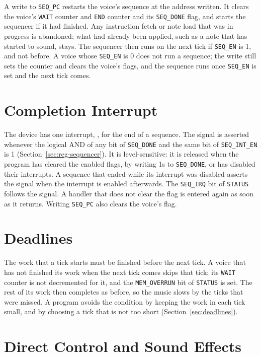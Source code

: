 A write to \texttt{SEQ\_PC} restarts the voice's sequence at the address written. It clears the voice's \texttt{WAIT}
counter and \texttt{END} counter and its \texttt{SEQ\_DONE} flag, and starts the sequencer if it had finished. Any
instruction fetch or note load that was in progress is abandoned; what had already been applied, such as a note that
has started to sound, stays. The sequencer then runs on the next tick if \texttt{SEQ\_EN} is 1, and not before. A voice
whose \texttt{SEQ\_EN} is 0 does not run a sequence; the write still sets the counter and clears the voice's flags, and
the sequence runs once \texttt{SEQ\_EN} is set and the next tick comes.

\section{Completion Interrupt}
\label{sec:interrupts}

The device has one interrupt, , for the end of a sequence. The signal is asserted whenever the logical
AND of any bit of \texttt{SEQ\_DONE} and the same bit of \texttt{SEQ\_INT\_EN} is 1 (Section~\ref{sec:reg-sequencer}).
It is level-sensitive: it is released when the program has cleared the enabled flags, by writing 1s to
\texttt{SEQ\_DONE}, or has disabled their interrupts. A sequence that ended while its interrupt was disabled asserts
the signal when the interrupt is enabled afterwards. The \texttt{SEQ\_IRQ} bit of \texttt{STATUS} follows the signal. A
handler that does not clear the flag is entered again as soon as it returns. Writing \texttt{SEQ\_PC} also clears the
voice's flag.

\section{Deadlines}
\label{sec:seq-deadlines}

The work that a tick starts must be finished before the next tick. A voice that has not finished its work when the next
tick comes skips that tick: its \texttt{WAIT} counter is not decremented for it, and the \texttt{MEM\_OVERRUN} bit of
\texttt{STATUS} is set. The rest of its work then completes as before, so the music slows by the ticks that were
missed. A program avoids the condition by keeping the work in each tick small, and by choosing a tick that is not too
short (Section~\ref{sec:deadlines}).

\section{Direct Control and Sound Effects}
\label{sec:direct-control}

